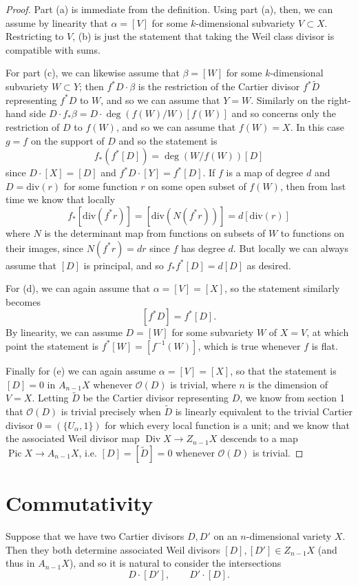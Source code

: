 \documentclass[12pt]{article}
\theoremstyle{definition}
\theoremstyle{theorem}
\renewcommand{\O}{\mathcal O}
\newcommand{\1}{\mathbbm 1}
\renewcommand{\div}{\text{div}}
\DeclareMathOperator{\Div}{Div}
\DeclareMathOperator{\Pic}{Pic}
\begin{document}
\begin{proof}
Part (a) is immediate from the definition. Using part (a), then, we can assume by linearity that $\alpha = [V]$ for some $k$-dimensional subvariety $V \subset X$. Restricting to $V$, (b) is just the statement that taking the Weil class divisor is compatible with sums.

For part (c), we can likewise assume that $\beta = [W]$ for some $k$-dimensional subvariety $W \subset Y$; then $f^* D \cdot \beta$ is the restriction of the Cartier divisor $f^* \tilde D$ representing $f^* D$ to $W$, and so we can assume that $Y = W$. Similarly on the right-hand side $D \cdot f_* \beta = D \cdot \deg(f(W)/W) [f(W)]$ and so concerns only the restriction of $D$ to $f(W)$, and so we can assume that $f(W) = X$. In this case $g = f$ on the support of $D$ and so the statement is \[ f_* (f^* [D]) = \deg(W/f(W)) [D] \] since $D \cdot [X] = [D]$ and $f^* D \cdot [Y] = f^* [D]$. If $f$ is a map of degree $d$ and $D = \div(r)$ for some function $r$ on some open subset of $f(W)$, then from last time we know that locally \[ f_* [\div(f^* r)] = [\div(N(f^* r))] = d [\div(r)] \] where $N$ is the determinant map from functions on subsets of $W$ to functions on their images, since $N(f^* r) = dr$ since $f$ has degree $d$. But locally we can always assume that $[D]$ is principal, and so $f_* f^* [D] = d [D]$ as desired.

For (d), we can again assume that $\alpha = [V] = [X]$, so the statement similarly becomes \[ [f^* D] = f^* [D] . \] By linearity, we can assume $D = [W]$ for some subvariety $W$ of $X = V$, at which point the statement is $f^* [W] = [f^{-1}(W)]$, which is true whenever $f$ is flat.

Finally for (e) we can again assume $\alpha = [V] = [X]$, so that the statement is $[D] = 0$ in $A_{n-1} X$ whenever $\O(D)$ is trivial, where $n$ is the dimension of $V = X$. Letting $\tilde D$ be the Cartier divisor representing $D$, we know from section 1 that $\O(D)$ is trivial precisely when $\tilde D$ is linearly equivalent to the trivial Cartier divisor $0 = (\{U_\alpha, 1\})$ for which every local function is a unit; and we know that the associated Weil divisor map $\Div X \to Z_{n-1} X$ descends to a map $\Pic X \to A_{n-1} X$, i.e. $[D] = [\tilde D] = 0$ whenever $\O(D)$ is trivial.
\end{proof}

\section{Commutativity}
Suppose that we have two Cartier divisors $D, D'$ on an $n$-dimensional variety $X$. Then they both determine associated Weil divisors $[D], [D'] \in Z_{n-1} X$ (and thus in $A_{n-1} X$), and so it is natural to consider the intersections \[ D \cdot [D'], \qquad D' \cdot [D] . \]
\end{document}
